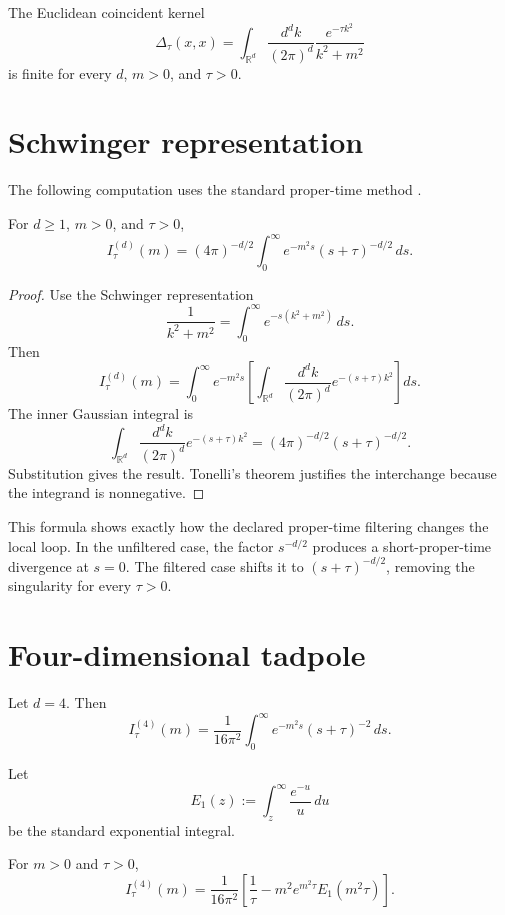 \documentclass[11pt]{article}
\begin{document}
\begin{corollary}
The Euclidean coincident kernel
\[
\Delta_\tau(x,x)
=
\int_{\mathbb R^d}\frac{d^d k}{(2\pi)^d}
\frac{e^{-\tau k^2}}{k^2+m^2}
\]
is finite for every \(d\), \(m>0\), and \(\tau>0\).
\end{corollary}

\section{Schwinger representation}

The following computation uses the standard proper-time method
\cite{Schwinger1951}.

\begin{theorem}
For \(d\ge1\), \(m>0\), and \(\tau>0\),
\[
I_\tau^{(d)}(m)
=
(4\pi)^{-d/2}
\int_0^\infty e^{-m^2s}(s+\tau)^{-d/2}\,ds.
\]
\end{theorem}

\begin{proof}
Use the Schwinger representation
\[
\frac{1}{k^2+m^2}=\int_0^\infty e^{-s(k^2+m^2)}\,ds.
\]
Then
\[
I_\tau^{(d)}(m)
=
\int_0^\infty e^{-m^2s}
\left[
\int_{\mathbb R^d}\frac{d^d k}{(2\pi)^d}e^{-(s+\tau)k^2}
\right]ds.
\]
The inner Gaussian integral is
\[
\int_{\mathbb R^d}\frac{d^d k}{(2\pi)^d}e^{-(s+\tau)k^2}
=
(4\pi)^{-d/2}(s+\tau)^{-d/2}.
\]
Substitution gives the result. Tonelli's theorem justifies the interchange because the integrand is nonnegative.
\end{proof}

\begin{remark}
This formula shows exactly how the declared proper-time filtering changes the local loop.  In
the unfiltered case, the factor \(s^{-d/2}\) produces a short-proper-time divergence at
\(s=0\).  The filtered case shifts it to \((s+\tau)^{-d/2}\), removing the singularity for
every \(\tau>0\).
\end{remark}

\section{Four-dimensional tadpole}

Let \(d=4\). Then
\[
I_\tau^{(4)}(m)
=
\frac{1}{16\pi^2}
\int_0^\infty e^{-m^2s}(s+\tau)^{-2}\,ds.
\]

Let
\[
E_1(z):=\int_z^\infty \frac{e^{-u}}{u}\,du
\]
be the standard exponential integral.

\begin{theorem}
For \(m>0\) and \(\tau>0\),
\[
I_\tau^{(4)}(m)
=
\frac{1}{16\pi^2}
\left[
\frac{1}{\tau}
-
m^2e^{m^2\tau}E_1(m^2\tau)
\right].
\]
\end{theorem}
\end{document}
